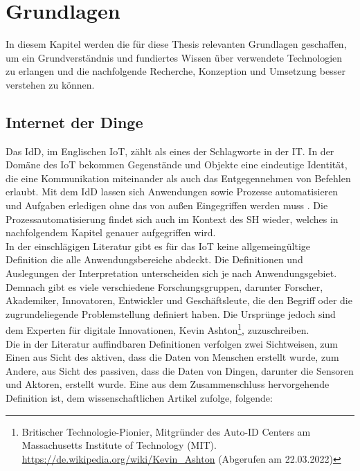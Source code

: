 \chapter{Grundlagen}
\label{chap:grundlagen}
    In diesem Kapitel werden die für diese Thesis relevanten Grundlagen geschaffen, um ein Grundverständnis und 
    fundiertes Wissen über verwendete Technologien zu erlangen und die nachfolgende Recherche, Konzeption und 
    Umsetzung besser verstehen zu können. 


\section{Internet der Dinge}
\label{sec:iot}
    Das \ac{IdD}, im Englischen \ac{IoT}, zählt als eines der Schlagworte in der \ac{IT}. In der Domäne des \acs{IoT} bekommen 
    Gegenstände und Objekte eine eindeutige Identität, die eine Kommunikation miteinander als auch das Entgegennehmen von 
    Befehlen erlaubt. Mit dem \acl{IdD} lassen sich Anwendungen sowie Prozesse automatisieren und Aufgaben erledigen ohne das 
    von außen Eingegriffen werden muss \cite{bigdatainsider2016}. Die Prozessautomatisierung findet sich auch im Kontext des 
    \acl{SH} wieder, welches in nachfolgendem Kapitel genauer aufgegriffen wird. 
    \\
    \linebreak
    In der einschlägigen Literatur gibt es für das \acl{IoT} keine allgemeingültige Definition die alle Anwendungsbereiche abdeckt. 
    Die Definitionen und Auslegungen der Interpretation unterscheiden sich je nach Anwendungsgebiet. Demnach gibt es viele verschiedene 
    Forschungsgruppen, darunter Forscher, Akademiker, Innovatoren, Entwickler und Geschäftsleute, die den Begriff oder die zugrundeliegende 
    Problemstellung definiert haben. Die Ursprünge jedoch sind dem Experten für digitale Innovationen, Kevin Ashton\footnote{Britischer Technologie-Pionier, Mitgründer des Auto-ID Centers am Massachusetts Institute of Technology (MIT). \url{https://de.wikipedia.org/wiki/Kevin_Ashton} (Abgerufen am 22.03.2022)}, 
    zuzuschreiben. 
    \\ 
    Die in der Literatur auffindbaren Definitionen verfolgen zwei Sichtweisen, zum Einen aus Sicht des aktiven, dass die Daten von 
    Menschen erstellt wurde, zum Andere, aus Sicht des passiven, dass die Daten von Dingen, darunter die Sensoren und Aktoren, 
    erstellt wurde. \cite{Madakam2015} Eine aus dem Zusammenschluss hervorgehende Definition ist, dem wissenschaftlichen Artikel zufolge, folgende:
